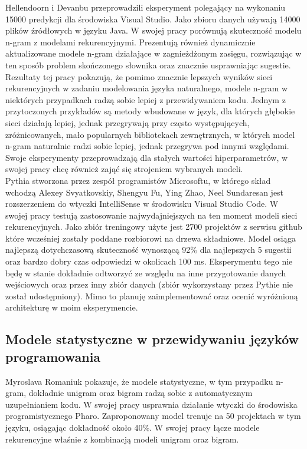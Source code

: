 Hellendoorn i Devanbu przeprowadzili eksperyment polegający na wykonaniu 15000 predykcji dla 
środowiska Visual Studio. Jako zbioru danych używają 14000 plików źródłowych w języku Java. 
W swojej pracy porównują skuteczność modelu n-gram z modelami rekurencyjnymi. 
Prezentują również dynamicznie aktualizowane modele n-gram działające w zagnieżdżonym zasięgu, rozwiązując 
w ten sposób problem skończonego słownika oraz znacznie usprawniając sugestie. Rezultaty tej pracy 
pokazują, że pomimo znacznie lepszych wyników sieci rekurencyjnych w zadaniu modelowania języka 
naturalnego, modele n-gram w niektórych przypadkach radzą sobie lepiej z przewidywaniem kodu. Jednym
z przytoczonych przykładów są metody wbudowane w język, dla których głębokie sieci działają lepiej, 
jednak przegrywają przy często występujących, zróżnicowanych,  mało popularnych bibliotekach zewnętrznych, 
w których model n-gram naturalnie radzi sobie lepiej, jednak przegrywa pod innymi względami. Swoje 
eksperymenty przeprowadzają dla stałych wartości hiperparametrów, w swojej pracy chcę również
zająć się strojeniem wybranych modeli. \\

Pythia \cite{pythia} stworzona przez zespół programistów Microsoftu, w którego skład wchodzą Alexey Svyatkovskiy, Shengyu Fu, Ying Zhao, Neel Sundaresan
jest rozszerzeniem do wtyczki IntelliSense w środowisku Visual Studio Code. W swojej pracy testują zastosowanie najwydajniejszych 
na ten moment modeli sieci rekurencyjnych. Jako zbiór treningowy użyte jest 2700 projektów z serwisu github \cite{github}
które wcześniej zostały poddane rozbiorowi na drzewa składniowe. Model osiąga najlepszą dotychczasową skuteczność wynoszącą
92\% dla najlepszych 5 sugestii oraz bardzo dobry czas odpowiedzi w okolicach 100 ms. Eksperymentu tego nie będę w stanie 
dokładnie odtworzyć ze względu na inne przygotowanie danych wejściowych oraz przez inny zbiór danych (zbiór wykorzystany przez
Pythie nie został udostępniony). Mimo to planuję zaimplementować oraz ocenić wyróżnioną architekturę w moim eksperymencie. 

\subsection {Modele statystyczne w przewidywaniu języków programowania}
Myroslava Romaniuk \cite{pharo} pokazuje, że modele statystyczne, w tym przypadku n-gram, dokładnie 
unigram oraz bigram radzą sobie 
z automatycznym uzupełnianiem kodu. W swojej pracy usprawnia działanie wtyczki do środowiska programistycznego 
Pharo. Zaproponowany model trenuje na 50 projektach w tym języku, osiągając dokładność około 40\%. 
W swojej pracy łącze modele rekurencyjne właśnie z kombinacją modeli unigram oraz bigram.

